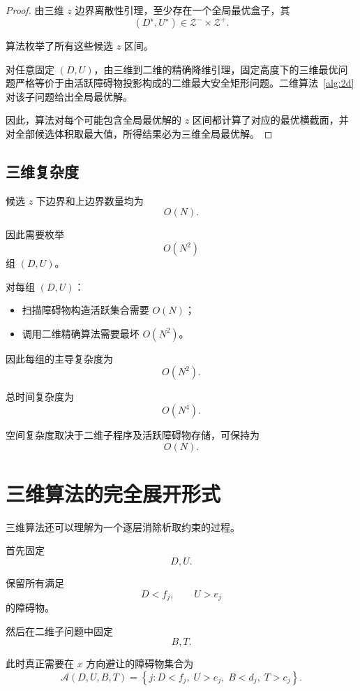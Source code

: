 \documentclass[UTF8,12pt,a4paper]{ctexart}
\begin{document}
\begin{proof}
由三维 $z$ 边界离散性引理，至少存在一个全局最优盒子，其
\[
(D^\star,U^\star)
\in
\mathcal Z^-\times\mathcal Z^+.
\]

算法枚举了所有这些候选 $z$ 区间。

对任意固定 $(D,U)$，由三维到二维的精确降维引理，固定高度下的三维最优问题严格等价于由活跃障碍物投影构成的二维最大安全矩形问题。二维算法~\ref{alg:2d} 对该子问题给出全局最优解。

因此，算法对每个可能包含全局最优解的 $z$ 区间都计算了对应的最优横截面，并对全部候选体积取最大值，所得结果必为三维全局最优解。
\end{proof}

\subsection{三维复杂度}

候选 $z$ 下边界和上边界数量均为
\[
O(N).
\]

因此需要枚举
\[
O(N^2)
\]
组 $(D,U)$。

对每组 $(D,U)$：
\begin{itemize}
    \item 扫描障碍物构造活跃集合需要 $O(N)$；
    \item 调用二维精确算法需要最坏 $O(N^2)$。
\end{itemize}

因此每组的主导复杂度为
\[
O(N^2).
\]

总时间复杂度为
\begin{equation}
\boxed{
O(N^4).
}
\end{equation}

空间复杂度取决于二维子程序及活跃障碍物存储，可保持为
\begin{equation}
\boxed{
O(N).
}
\end{equation}

\section{三维算法的完全展开形式}

三维算法还可以理解为一个逐层消除析取约束的过程。

首先固定
\[
D,U.
\]

保留所有满足
\[
D<f_j,
\qquad
U>e_j
\]
的障碍物。

然后在二维子问题中固定
\[
B,T.
\]

此时真正需要在 $x$ 方向避让的障碍物集合为
\begin{equation}
\boxed{
\mathcal A(D,U,B,T)
=
\left\{
j:
D<f_j,\;
U>e_j,\;
B<d_j,\;
T>c_j
\right\}.
}
\end{equation}
\end{document}
